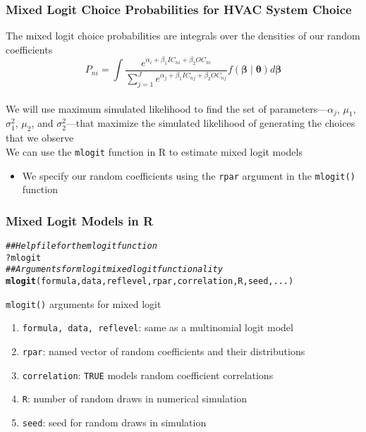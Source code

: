\documentclass{beamer}\usepackage[]{graphicx}\usepackage[]{color}
\makeatletter
\newcommand{\hlcom}[1]{\textcolor[rgb]{0.678,0.584,0.686}{\textit{#1}}}%
\newcommand{\hlopt}[1]{\textcolor[rgb]{0,0,0}{#1}}%
\newcommand{\hlstd}[1]{\textcolor[rgb]{0.345,0.345,0.345}{#1}}%
\newcommand{\hlkwd}[1]{\textcolor[rgb]{0.737,0.353,0.396}{\textbf{#1}}}%
\newenvironment{kframe}{%
 \def\at@end@of@kframe{}%
 \ifinner\ifhmode%
  \def\at@end@of@kframe{\end{minipage}}%
  \begin{minipage}{\columnwidth}%
 \fi\fi%
 \def\FrameCommand##1{\hskip\@totalleftmargin \hskip-\fboxsep
 \colorbox{shadecolor}{##1}\hskip-\fboxsep
     \hskip-\linewidth \hskip-\@totalleftmargin \hskip\columnwidth}%
 \MakeFramed {\advance\hsize-\width
   \@totalleftmargin\z@ \linewidth\hsize
   \@setminipage}}%
 {\par\unskip\endMakeFramed%
 \at@end@of@kframe}
\newenvironment{knitrout}{}{} %
\makeatother
\begin{document}
\begin{frame}\frametitle{Mixed Logit Choice Probabilities for HVAC System Choice}
    The mixed logit choice probabilities are integrals over the densities of our random coefficients
    $$P_{ni} = \int \frac{e^{\alpha_i + \beta_1 IC_{ni} + \beta_2 OC_{ni}}}{\sum_{j = 1}^J e^{\alpha_j + \beta_1 IC_{nj} + \beta_2 OC_{nj}}} f(\bm{\beta} \mid \bm{\theta}) d \bm{\beta}$$ \\
    \vspace{2ex}
    We will use maximum simulated likelihood to find the set of parameters---$\alpha_j$, $\mu_1$, $\sigma_1^2$, $\mu_2$, and $\sigma_2^2$---that maximize the simulated likelihood of generating the choices that we observe \\
    \vspace{2ex}
    We can use the \texttt{mlogit} function in R to estimate mixed logit models
    \begin{itemize}
        \item We specify our random coefficients using the \texttt{rpar} argument in the \texttt{mlogit()} function
    \end{itemize}
\end{frame}

\begin{frame}[fragile]\frametitle{Mixed Logit Models in R}
\begin{knitrout}\footnotesize
{}\color{fgcolor}\begin{kframe}
\begin{alltt}
\hlcom{## Help file for the mlogit function}
\hlopt{?}\hlstd{mlogit}
\hlcom{## Arguments for mlogit mixed logit functionality}
\hlkwd{mlogit}\hlstd{(formula, data, reflevel, rpar, correlation, R, seed, ...)}
\end{alltt}
\end{kframe}
\end{knitrout}
    \vspace{2ex}
    \texttt{mlogit()} arguments for mixed logit
    \begin{enumerate}
        \item \texttt{formula, data, reflevel}: same as a multinomial logit model
        \item \texttt{rpar}: named vector of random coefficients and their distributions
        \item \texttt{correlation}: \texttt{TRUE} models random coefficient correlations
        \item \texttt{R}: number of random draws in numerical simulation
        \item \texttt{seed}: seed for random draws in simulation
    \end{enumerate}
\end{frame}
\end{document}
